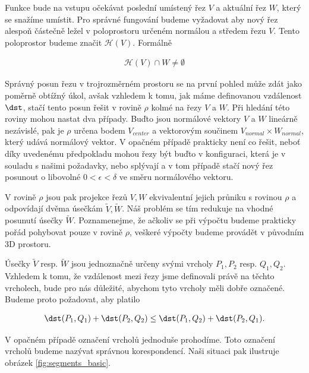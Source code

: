 Funkce bude na vstupu očekávat poslední umístený řez $ V $ a aktuální řez $ W $,
který se snažíme umístit. Pro správné fungování budeme vyžadovat aby nový řez
alespoň částečně ležel v poloprostoru určeném normálou a středem řezu $ V $.
Tento poloprostor budeme značit $ \mathcal{H}(V) $. Formálně

\begin{align} \label{cond:halfspace}
    \mathcal{H}(V) \cap W \neq \emptyset
\end{align}

Správný posun řezu v trojrozměrném prostoru se na první pohled může zdát jako
poměrně obtížný úkol, avšak vzhledem k tomu, jak máme definovanou vzdálenost $ \dst $,
stačí tento posun řešit v rovině $ \rho $ kolmé na řezy $ V $ a $ W $. Při hledání této
roviny mohou nastat dva případy. Buďto jsou normálové vektory $ V $ a $ W $ lineárně
nezávislé, pak je $ \rho $ určena bodem $ V_{center} $ a vektorovým součinem
$ V_{normal} \times W_{normal} $, který udává normálový vektor. V opačném případě
prakticky není co řešit, neboť díky uvedenému předpokladu mohou řezy být buďto
v konfiguraci, která je v souladu s našimi požadavky, nebo splývají a v tom
případě stačí nový řez posunout o libovolné $ 0 < \epsilon < \delta $ ve směru
normálového vektoru.

V rovině $ \rho $ jsou pak projekce řezů $ V, W $ ekvivalentní jejich průniku
s rovinou $ \rho $ a odpovídají dvěma úsečkám $ \widetilde{V}, \widetilde{W} $.
Náš problém se tím redukuje na vhodné posunutí úsečky $ \widetilde{W} $.
Poznamenejme, že ačkoliv se při výpočtu budeme prakticky pořád pohybovat pouze
v rovině $ \rho $, veškeré výpočty budeme provádět v původním 3D prostoru.

Úsečky $ \widetilde{V} $ resp.
$ \widetilde{W} $ jsou jednoznačně určeny svými vrcholy $ P_1, P_2 $ resp. $ Q_1, Q_2 $.
Vzhledem k tomu, že vzdálenost mezi řezy jsme definovali právě na těchto vrcholech,
bude pro nás důležité, abychom tyto vrcholy měli dobře označené. Budeme proto
požadovat, aby platilo

\begin{align*}
    \dst(P_1, Q_1) + \dst(P_2, Q_2) \leq \dst(P_1, Q_2) + \dst(P_2, Q_1).
\end{align*}

V opačném případě označení vrcholů jednoduše prohodíme. Toto označení vrcholů
budeme nazývat správnou korespondencí. Naši situaci pak ilustruje obrázek
\ref{fig:segments_basic}.

